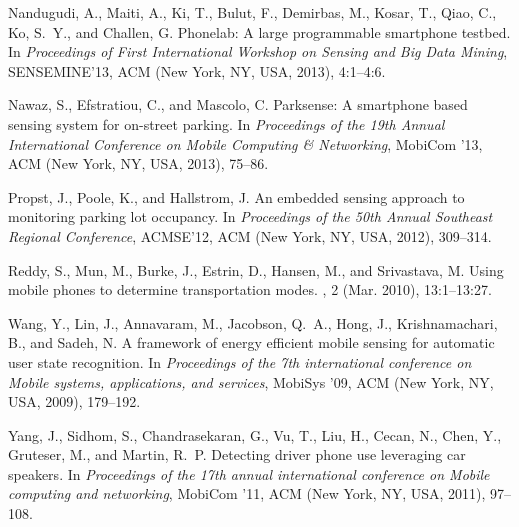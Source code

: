 \documentclass{sigchi}
\begin{document}
{\begin{thebibliography}{10}
Nandugudi, A., Maiti, A., Ki, T., Bulut, F., Demirbas, M., Kosar, T., Qiao, C.,
  Ko, S.~Y., and Challen, G.
\newblock Phonelab: A large programmable smartphone testbed.
\newblock In {\em Proceedings of First International Workshop on Sensing and
  Big Data Mining}, SENSEMINE'13, ACM (New York, NY, USA, 2013), 4:1--4:6.

Nawaz, S., Efstratiou, C., and Mascolo, C.
\newblock Parksense: A smartphone based sensing system for on-street parking.
\newblock In {\em Proceedings of the 19th Annual International Conference on
  Mobile Computing \& Networking}, MobiCom '13, ACM (New York, NY, USA, 2013),
  75--86.

Propst, J., Poole, K., and Hallstrom, J.
\newblock An embedded sensing approach to monitoring parking lot occupancy.
\newblock In {\em Proceedings of the 50th Annual Southeast Regional
  Conference}, ACMSE'12, ACM (New York, NY, USA, 2012), 309--314.

Reddy, S., Mun, M., Burke, J., Estrin, D., Hansen, M., and Srivastava, M.
\newblock Using mobile phones to determine transportation modes.
, 2 (Mar. 2010), 13:1--13:27.

Wang, Y., Lin, J., Annavaram, M., Jacobson, Q.~A., Hong, J., Krishnamachari,
  B., and Sadeh, N.
\newblock A framework of energy efficient mobile sensing for automatic user
  state recognition.
\newblock In {\em Proceedings of the 7th international conference on Mobile
  systems, applications, and services}, MobiSys '09, ACM (New York, NY, USA,
  2009), 179--192.

Yang, J., Sidhom, S., Chandrasekaran, G., Vu, T., Liu, H., Cecan, N., Chen, Y.,
  Gruteser, M., and Martin, R.~P.
\newblock Detecting driver phone use leveraging car speakers.
\newblock In {\em Proceedings of the 17th annual international conference on
  Mobile computing and networking}, MobiCom '11, ACM (New York, NY, USA, 2011),
  97--108.

\end{thebibliography}

}
\end{document}
